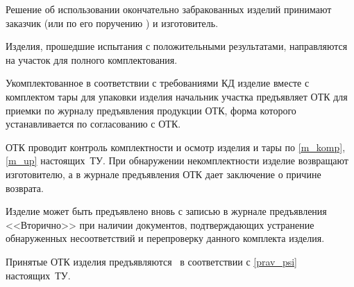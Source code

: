 Решение об использовании окончательно забракованных изделий принимают заказчик (или по его поручению \client) и изготовитель.

\fakesection{}
Изделия, прошедшие испытания с положительными результатами, направляются на участок для полного комплектования.

\fakesection{}
Укомплектованное в соответствии с требованиями КД изделие вместе с комплектом тары для упаковки изделия начальник участка предъявляет ОТК для приемки по журналу предъявления продукции ОТК, форма которого устанавливается по согласованию с ОТК.

\fakesection{}
ОТК проводит контроль комплектности и осмотр изделия и тары по \ref{m_komp}, \ref{m_up} настоящих~ТУ. При обнаружении некомплектности изделие возвращают изготовителю, а в журнале предъявления ОТК дает заключение о причине возврата.

\fakesection{}
Изделие может быть предъявлено вновь с записью в журнале предъявления <<Вторично>> при наличии документов, подтверждающих устранение обнаруженных несоответствий и перепроверку данного комплекта изделия.

\fakesection{}
Принятые ОТК изделия предъявляются \client \ в соответствии с \ref{prav_psi} настоящих~ТУ.